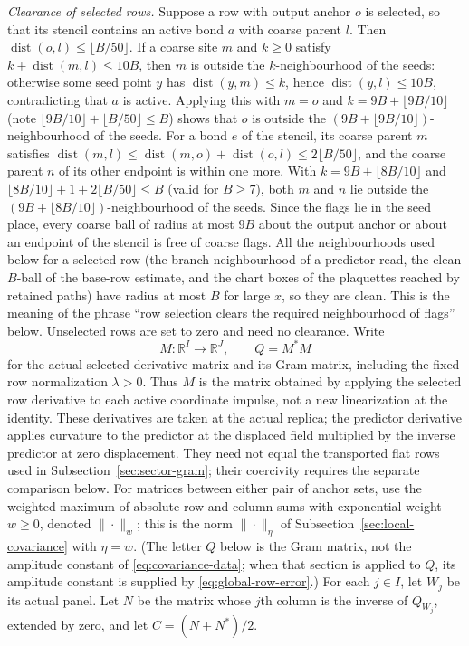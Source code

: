 \emph{Clearance of selected rows.} Suppose a row with output anchor
$o$ is selected, so that its stencil contains an active bond $a$ with
coarse parent $l$. Then $\operatorname{dist}(o,l)\le\lfloor B/50\rfloor$.
If a coarse site $m$ and $k\ge0$ satisfy
$k+\operatorname{dist}(m,l)\le10B$, then $m$ is outside the
$k$-neighbourhood of the seeds: otherwise some seed point $y$ has
$\operatorname{dist}(y,m)\le k$, hence $\operatorname{dist}(y,l)\le10B$,
contradicting that $a$ is active. Applying this with $m=o$ and
$k=9B+\lfloor9B/10\rfloor$ (note
$\lfloor9B/10\rfloor+\lfloor B/50\rfloor\le B$) shows that $o$ is
outside the $(9B+\lfloor9B/10\rfloor)$-neighbourhood of the seeds.
For a bond $e$ of the stencil, its coarse parent $m$ satisfies
$\operatorname{dist}(m,l)\le\operatorname{dist}(m,o)+\operatorname{dist}(o,l)
\le2\lfloor B/50\rfloor$, and the coarse parent $n$ of its other
endpoint is within one more. With $k=9B+\lfloor8B/10\rfloor$ and
$\lfloor8B/10\rfloor+1+2\lfloor B/50\rfloor\le B$ (valid for $B\ge7$),
both $m$ and $n$ lie outside the $(9B+\lfloor8B/10\rfloor)$-neighbourhood
of the seeds. Since the flags lie in the seed place, every coarse ball
of radius at most $9B$ about the output anchor or about an endpoint of
the stencil is free of coarse flags. All the neighbourhoods used below
for a selected row (the branch neighbourhood of a predictor read, the
clean $B$-ball of the base-row estimate, and the chart boxes of the
plaquettes reached by retained paths) have radius at most $B$ for large
$x$, so they are clean. This is the meaning of the phrase ``row selection
clears the required neighbourhood of flags'' below. Unselected rows are
set to zero and need no clearance. Write
\[
             M:\mathbb R^I\longrightarrow\mathbb R^J,
             \qquad Q=M^*M
\]
for the actual selected derivative matrix and its Gram matrix, including
the fixed row normalization $\lambda>0$. Thus $M$ is the matrix obtained
by applying the selected row derivative to each active coordinate
impulse, not a new linearization at the identity. These derivatives
are taken at the actual replica; the predictor derivative applies
curvature to the predictor at the displaced field multiplied by the
inverse predictor at zero displacement. They need not equal the
transported flat rows used in Subsection~\ref{sec:sector-gram}; their
coercivity requires the separate comparison below.
For matrices between either pair of anchor sets, use the weighted maximum
of absolute row and column sums with exponential weight $w\ge0$, denoted
$\|\cdot\|_w$; this is the norm $\|\cdot\|_\eta$ of
Subsection~\ref{sec:local-covariance} with $\eta=w$. (The letter $Q$ below
is the Gram matrix, not the amplitude constant of
\eqref{eq:covariance-data}; when that section is applied to $Q$, its
amplitude constant is supplied by \eqref{eq:global-row-error}.) For each $j\in I$, let $W_j$ be its
actual panel. Let $N$ be the matrix whose $j$th column is the inverse
of $Q_{W_j}$, extended by zero, and let $C=(N+N^*)/2$.

